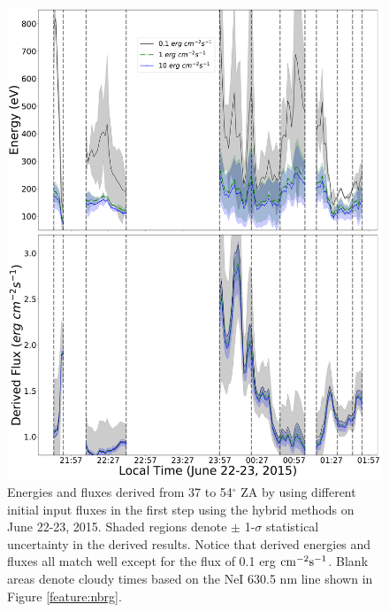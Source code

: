 \begin{figure}
	\centering\includegraphics[width=30pc]{ratio_method_dfl.pdf}
	\caption{Energies and fluxes derived from 37 to 54$^\circ$ ZA by using different initial input fluxes in the first step using the hybrid methods on June 22-23, 2015. Shaded regions denote $\pm$ 1-$\sigma$ statistical uncertainty in the derived results. Notice that derived energies and fluxes all match well except for the flux of 0.1 erg $\rm cm^{-2} s^{-1}$. Blank areas denote cloudy times based on the NeI 630.5 nm line shown in Figure \ref{feature:nbrg}.}
	\label{fig:fl_d}
\end{figure}
